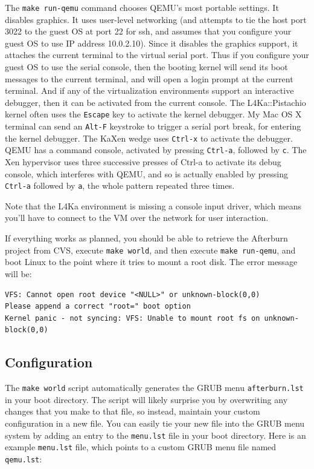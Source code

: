 \documentclass[10pt,a4paper]{article}
\newcommand{\cmd}[1]{\texttt{#1}}
\newcommand{\dir}[1]{\texttt{#1}}
\begin{document}
The \cmd{make run-qemu} command chooses QEMU's most portable settings.
It disables graphics.  It uses user-level networking (and attempts to
tie the host port 3022 to the guest OS at port 22 for ssh, and assumes
that you configure your guest OS to use IP address 10.0.2.10).  Since
it disables the graphics support, it attaches the current terminal to
the virtual serial port.  Thus if you configure your guest OS to use
the serial console, then the booting kernel will send its boot
messages to the current terminal, and will open a login prompt at the
current terminal.  And if any of the virtualization environments
support an interactive debugger, then it can be activated from the
current console.  The L4Ka::Pistachio kernel often uses the
\cmd{Escape} key to activate the kernel debugger.  My Mac OS X
terminal can send an \cmd{Alt-F} keystroke to trigger a serial port
break, for entering the kernel debugger.  The KaXen wedge uses
\cmd{Ctrl-x} to activate the debugger.  QEMU has a command console,
activated by pressing \cmd{Ctrl-a}, followed by \cmd{c}. The Xen
hypervisor uses three successive presses of Ctrl-a to activate its
debug console, which interferes with QEMU, and so is actually enabled
by pressing \cmd{Ctrl-a} followed by \cmd{a}, the whole pattern
repeated three times.

Note that the L4Ka environment is missing a console input driver,
which means you'll have to connect to the VM over the network for user
interaction.

If everything works as planned, you should be able to retrieve the
Afterburn project from CVS, execute \cmd{make world}, and then execute
\cmd{make run-qemu}, and boot Linux to the point where it tries to
mount a root disk.  The error message will be:

\begin{footnotesize}
\begin{verbatim}
VFS: Cannot open root device "<NULL>" or unknown-block(0,0)
Please append a correct "root=" boot option
Kernel panic - not syncing: VFS: Unable to mount root fs on unknown-block(0,0)
\end{verbatim}
\end{footnotesize}

\subsection{Configuration}

The \cmd{make world} script automatically generates the GRUB menu
\dir{afterburn.lst} in your boot directory.  The script will likely
surprise you by overwriting any changes that you make to that file, so
instead, maintain your custom configuration in a new file.  You can
easily tie your new file into the GRUB menu system by adding an entry
to the \dir{menu.lst} file in your boot directory.  Here is an example
\dir{menu.lst} file, which points to a custom GRUB menu file named
\dir{qemu.lst}:
\end{document}
